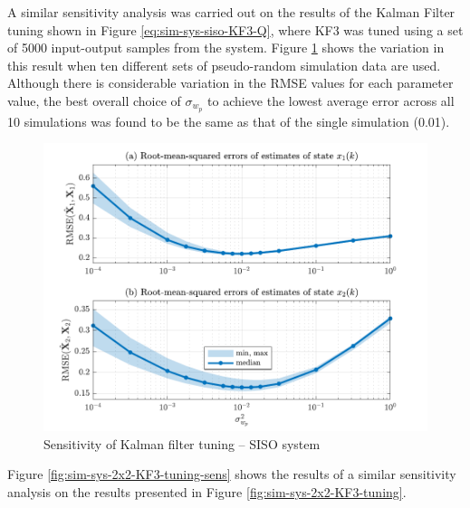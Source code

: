 A similar sensitivity analysis was carried out on the results of the Kalman Filter tuning shown in Figure \ref{eq:sim-sys-siso-KF3-Q}, where KF3 was tuned using a set of 5000 input-output samples from the system. Figure \ref{fig:sim-sys-siso-KF3-sensitivity} shows the variation in this result when ten different sets of pseudo-random simulation data are used.  Although there is considerable variation in the \gls{RMSE} values for each parameter value, the best overall choice of $\sigma_{w_p}$ to achieve the lowest average error across all 10 simulations was found to be the same as that of the single simulation (0.01).

\begin{figure}[htp]
	\centering
	\includegraphics[width=14cm]{images/rod_obs_sim1_3KF_Q_statplot.pdf}
	\caption{Sensitivity of Kalman filter tuning – SISO system}
	\label{fig:sim-sys-siso-KF3-sensitivity}
\end{figure}

Figure \ref{fig:sim-sys-2x2-KF3-tuning-sens} shows the results of a similar sensitivity analysis on the results presented in Figure \ref{fig:sim-sys-2x2-KF3-tuning}.

